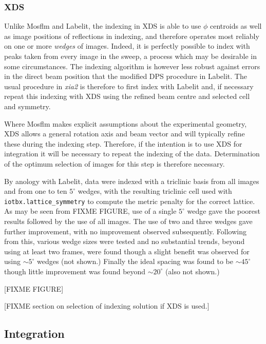 \documentclass[a4paper,11pt]{article}
\begin{document}
\subsubsection{XDS}

Unlike Mosflm and Labelit, the indexing in XDS is able to use $\phi$
centroids as well as image positions of reflections in indexing, and
therefore operates most reliably on one or more \emph{wedges} of
images. Indeed, it is perfectly possible to index with peaks taken
from every image in the sweep, a process which may be desirable in some
circumstances. The indexing algorithm is however less robust against
errors in the direct beam position that the modified DPS procedure in
Labelit. The usual procedure in \emph{xia2} is therefore to first
index with Labelit and, if necessary repeat this indexing with XDS
using the refined beam centre and selected cell and symmetry. 

Where Mosflm makes explicit assumptions about the experimental
geometry, XDS allows a general rotation axis and beam vector and will
typically refine these during the indexing step. Therefore, if the
intention is to use XDS for integration it will be necessary to
repeat the indexing of the data. Determination of the optimum
selection of images for this step is therefore necessary.

By anology with Labelit, data were indexed with a triclinic basis
from all images and from one to ten $5^{\circ}$ wedges, with the
resulting triclinic cell used with \verb|iotbx.lattice_symmetry| to
compute the metric penalty for the correct lattice. As may be seen
from FIXME FIGURE, use of a single $5^{\circ}$ wedge gave the poorest
results followed by the use of all images. The use of two and three
wedges gave further improvement, with no improvement observed
subsequently. Following from this, various wedge sizes were tested and
no substantial trends, beyond using at least two frames, were found
though a slight benefit was observed for using $\sim 5^{\circ}$ wedges
(not shown.) Finally the ideal spacing was found to be $\sim
45^{\circ}$ though little improvement was found beyond $\sim
20^{\circ}$ (also not shown.)  

[FIXME FIGURE]

[FIXME section on selection of indexing solution if XDS is used.]

\subsection{Integration}
\end{document}
